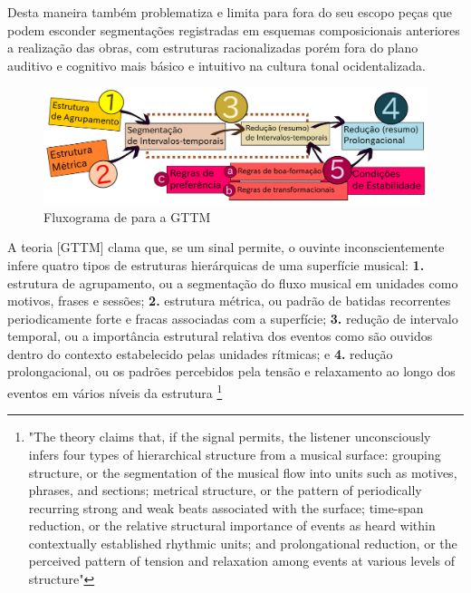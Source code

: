 \documentclass[
	12pt,				%
	openright,			%
	twoside,			%
	a4paper,			%
	english,			%
	french,				%
	spanish,			%
	brazil				%
	]{abntex2}
\begin{document}
Desta maneira também problematiza e limita para fora do seu escopo peças que podem esconder segmentações registradas em esquemas composicionais anteriores a realização das obras, com estruturas racionalizadas porém fora do plano auditivo e cognitivo mais básico e intuitivo na cultura tonal ocidentalizada. 


\begin{figure}[!h]
	\caption{\label{fig_grafico}Fluxograma de  para a GTTM}
	\begin{center}
	    \includegraphics[scale=0.5]{gttm/GTTM_rules.pdf}
	\end{center}
\end{figure}


\begin{citacao}
A teoria [GTTM] clama que, se um sinal permite, o ouvinte inconscientemente infere quatro tipos de estruturas hierárquicas de uma superfície musical:\linebreak 
\textbf{1.} estrutura de agrupamento, ou a segmentação do fluxo musical em unidades como motivos, frases e sessões; 
\textbf{2.} estrutura métrica, ou padrão de batidas recorrentes periodicamente forte e fracas associadas com a superfície; 
\textbf{3.} redução de intervalo temporal, ou a importância estrutural relativa dos eventos como são ouvidos dentro do contexto estabelecido pelas unidades rítmicas; e
\textbf{4.} redução prolongacional, ou os padrões percebidos pela tensão e relaxamento ao longo dos eventos em vários níveis da estrutura \cite{lerdahl1992cognitive}
\footnote{
"The theory claims that, if the signal permits, the listener unconsciously infers four types of hierarchical structure from a musical surface: grouping structure, or the segmentation of the musical flow into units such as motives, phrases, and sections; metrical structure, or the pattern of periodically recurring strong and weak beats associated with the surface; time-span reduction, or the relative structural importance of events as heard within contextually established rhythmic units; and prolongational reduction, or the perceived pattern of tension and relaxation among events at various levels of structure"\cite{lerdahl1992cognitive}

}
\end{citacao}
\end{document}
